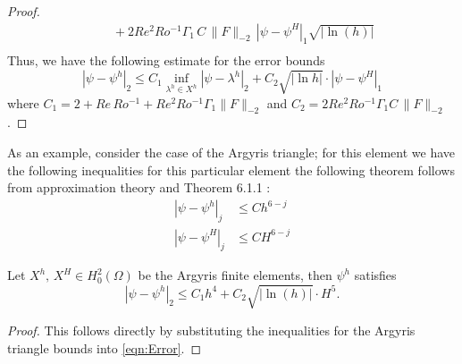 \begin{proof}
\begin{align*}
      &\quad + 2 Re^2 Ro^{-1} \Gamma_1\, C\, \|F\|_{-2}\, |\psi - \psi^H|_1 \sqrt{|\ln(h)|} \\
  \end{align*}
  Thus, we have the following estimate for the error bounds
  \begin{equation*}
    |\psi-\psi^h|_2 \le C_1 \inf_{\lambda^h\in X^h} |\psi-\lambda^h|_2 + C_2 \sqrt{|\ln h|}\cdot |\psi -
      \psi^H|_1
  \end{equation*}
  where $C_1 = 2 + Re\,Ro^{-1} + Re^2 Ro^{-1} \Gamma_1 \|F\|_{-2}$ and $C_2= 2 Re^2 Ro^{-1} \Gamma_1
  C\,\|F\|_{-2}$. 
\end{proof}

As an example, consider the case of the Argyris triangle; for this element we have the following inequalities
for this particular element the following theorem follows from approximation theory \cite{Bernadou94} and Theorem 6.1.1 \cite{Ciarlet}: 
\begin{align*}
  |\psi - \psi^h|_j &\le Ch^{6-j} \\
  |\psi - \psi^H|_j &\le CH^{6-j} 
\end{align*}
\begin{corollary}
  Let $X^h,\, X^H \in H^2_0(\Omega)$ be the Argyris finite elements, then $\psi^h$ satisfies
  \begin{equation}
    |\psi - \psi^h|_2 \le C_1 h^4 + C_2 \sqrt{|\ln(h)|}\cdot H^5.
    \label{eqn:TwoLevelError}
  \end{equation}
\end{corollary}
\begin{proof}
  This follows directly by substituting the inequalities for the Argyris triangle bounds into \eqref{eqn:Error}.
\end{proof}
